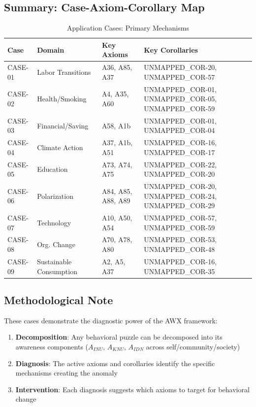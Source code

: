 
\subsection{Summary: Case-Axiom-Corollary Map}

\begin{table}[htbp]
\centering
\caption{Application Cases: Primary Mechanisms}
\label{tab:case-summary}
\small
\begin{tabular}{llll}
\toprule
\textbf{Case} & \textbf{Domain} & \textbf{Key Axioms} & \textbf{Key Corollaries} \\
\midrule
CASE-01 & Labor Transitions & A36, A85, A37 & UNMAPPED_COR-20, UNMAPPED_COR-57 \\
CASE-02 & Health/Smoking & A4, A35, A60 & UNMAPPED_COR-01, UNMAPPED_COR-05, UNMAPPED_COR-59 \\
CASE-03 & Financial/Saving & A58, A1b & UNMAPPED_COR-01, UNMAPPED_COR-04 \\
CASE-04 & Climate Action & A37, A1b, A51 & UNMAPPED_COR-16, UNMAPPED_COR-17 \\
CASE-05 & Education & A73, A74, A75 & UNMAPPED_COR-22, UNMAPPED_COR-20 \\
CASE-06 & Polarization & A84, A85, A88, A89 & UNMAPPED_COR-20, UNMAPPED_COR-24, UNMAPPED_COR-29 \\
CASE-07 & Technology & A10, A50, A54 & UNMAPPED_COR-57, UNMAPPED_COR-59 \\
CASE-08 & Org. Change & A70, A78, A80 & UNMAPPED_COR-53, UNMAPPED_COR-48 \\
CASE-09 & Sustainable Consumption & A2, A5, A37 & UNMAPPED_COR-16, UNMAPPED_COR-35 \\
\bottomrule
\end{tabular}
\end{table}

\subsection{Methodological Note}

These cases demonstrate the diagnostic power of the AWX framework:

\begin{enumerate}
    \item \textbf{Decomposition}: Any behavioral puzzle can be decomposed into its awareness components ($A_{INU}$, $A_{KNU}$, $A_{IDN}$ across self/community/society)
    \item \textbf{Diagnosis}: The active axioms and corollaries identify the specific mechanisms creating the anomaly
    \item \textbf{Intervention}: Each diagnosis suggests which axioms to target for behavioral change
\end{enumerate}

